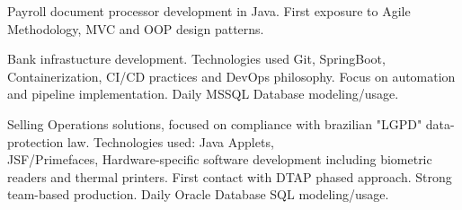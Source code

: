 \documentclass[10pt,a4paper,ragged2e]{altacv}
\begin{document}

\begin{fullwidth}
\makecvheader
\end{fullwidth}



Payroll document processor development in Java. First exposure to Agile Methodology, MVC and OOP design patterns.
\\


\divider

Bank infrastucture development. Technologies used Git, SpringBoot, Containerization, CI/CD practices and DevOps philosophy. Focus on automation and pipeline implementation. Daily MSSQL Database modeling/usage.
\\


\divider

Selling Operations solutions, focused on compliance with brazilian "LGPD" data-protection law. Technologies used: Java Applets,\\ JSF/Primefaces, Hardware-specific software development including biometric readers and thermal printers. First contact with DTAP phased approach. Strong team-based production. Daily Oracle Database SQL modeling/usage.
\\
\end{document}
